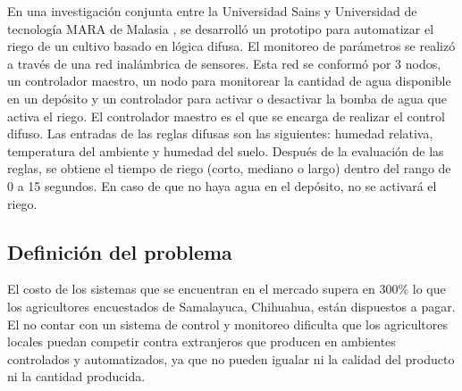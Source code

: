 En una investigación conjunta entre la Universidad Sains y Universidad de tecnología MARA de Malasia \cite{fuzzy_systems_agriculture}, se desarrolló un prototipo para automatizar el riego de un cultivo basado en lógica difusa. El monitoreo de parámetros se realizó a través de una red inalámbrica de sensores. Esta red se conformó por 3 nodos, un controlador maestro, un nodo para monitorear la cantidad de agua disponible en un depósito y un controlador para activar o desactivar la bomba de agua que activa el riego. El controlador maestro es el que se encarga de realizar el control difuso. Las entradas de las reglas difusas son las siguientes: humedad relativa, temperatura del ambiente y humedad del suelo. Después de la evaluación de las reglas, se obtiene el tiempo de riego (corto, mediano o largo) dentro del rango de 0 a 15 segundos. En caso de que no haya agua en el depósito, no se activará el riego.


\subsection{Definición del problema}
El costo de los sistemas que se encuentran en el mercado supera en 300\% lo que los agricultores encuestados de Samalayuca, Chihuahua, están dispuestos a pagar. El no contar con un sistema de control y monitoreo dificulta que los agricultores locales puedan competir contra extranjeros que producen en ambientes controlados y automatizados, ya que no pueden igualar ni la calidad del producto ni la cantidad producida.